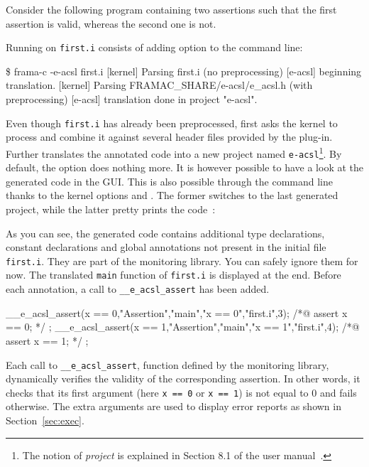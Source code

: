 Consider the following program containing two \eacsl assertions such that
the first assertion is valid, whereas the second one is not.


Running \eacsl on \texttt{first.i} consists of adding  option
to the \framac command line:
\begin{shell}
\$ frama-c -e-acsl first.i
[kernel] Parsing first.i (no preprocessing)
[e-acsl] beginning translation.
[kernel] Parsing FRAMAC_SHARE/e-acsl/e_acsl.h (with preprocessing)
[e-acsl] translation done in project "e-acsl".
\end{shell}

Even though \texttt{first.i} has already been preprocessed, \eacsl first asks
the \framac kernel to process and combine it against several header files
provided by the \eacsl plug-in.  Further \eacsl translates the annotated code
into a new \framac project named \texttt{e-acsl}\footnote{The notion of
  \emph{project} is explained in Section 8.1 of the \framac user
  manual~\cite{userman}.}. By default, the option  does nothing
more. It is however possible to have a look at the generated code in the
\framac GUI. This is also possible through the command line thanks to the
kernel options  and . The former
switches to the last generated project, while the latter pretty prints the \C
code~\cite{userman}:



As you can see, the generated code contains additional type declarations,
constant declarations and global \acsl annotations not present in the initial
file \texttt{first.i}. They are part of the \eacsl monitoring library. You can
safely ignore them for now. The translated \texttt{main} function of
\texttt{first.i} is displayed at the end. Before each \eacsl annotation,
a call to \texttt{\_\_e\_acsl\_assert} has been added.

\begin{minipage}{\linewidth}
\begin{ccode}
  __e_acsl_assert(x == 0,"Assertion","main","x == 0","first.i",3);
  /*@ assert x == 0; */ ;
  __e_acsl_assert(x == 1,"Assertion","main","x == 1","first.i",4);
  /*@ assert x == 1; */ ;
\end{ccode}
\end{minipage}

Each call to \texttt{\_\_e\_acsl\_assert}, function
defined by the \eacsl monitoring library, dynamically verifies the validity of
the corresponding assertion.  In other words, it checks that its first argument
(here \texttt{x == 0} or \texttt{x == 1}) is not equal to 0 and fails
otherwise. The extra arguments are used to display error reports as shown in
Section~\ref{sec:exec}.

